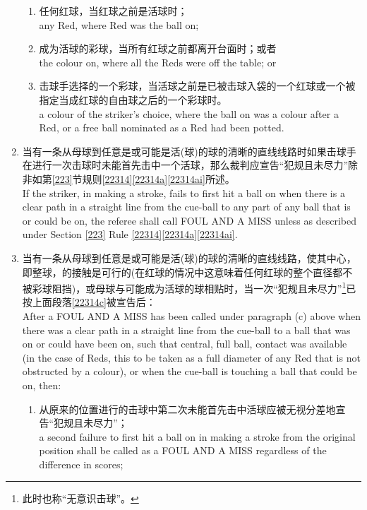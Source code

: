 \begin{enumerate}[label=(\alph*)]
    \begin{enumerate}[label=(\roman*)]
        \item 任何红球，当红球之前是活球时；\\
        any Red, where Red was the ball on;
        \item 成为活球的彩球，当所有红球之前都离开台面时；或者\\
        the colour on, where all the Reds were off the table; or
        \item 击球手选择的一个彩球，当活球之前是已被击球入袋的一个红球或一个被指定当成红球的自由球之后的一个彩球时。\\
        a colour of the striker's choice, where the ball on was a colour after a Red, or a free ball nominated as a Red had been potted.
    \end{enumerate}
    \item \label{22314c}当有一条从母球到任意是或可能是活(球)的球的清晰的直线线路时如果击球手在进行一次击球时未能首先击中一个活球，那么裁判应宣告``犯规且未尽力''除非如第\ref{223}节规则\ref{22314}\ref{22314a}\ref{22314ai}所述。\\
    If the striker, in making a stroke, fails to first hit a ball on when there is a clear path in a straight line from the cue-ball to any part of any ball that is or could be on, the referee shall call FOUL AND A MISS unless as described under Section \ref{223} Rule \ref{22314}\ref{22314a}\ref{22314ai}.
    \item \label{22314d}当有一条从母球到任意是或可能是活(球)的球的清晰的直线线路，使其中心，即整球，的接触是可行的(在红球的情况中这意味着任何红球的整个直径都不被彩球阻挡)，或母球与可能成为活球的球相贴时，当一次``犯规且未尽力''\footnote{此时也称``无意识击球''。}已按上面段落\ref{22314c}被宣告后：\\
    After a FOUL AND A MISS has been called under paragraph (c) above when there was a clear path in a straight line from the cue-ball to a ball that was on or could have been on, such that central, full ball, contact was available (in the case of Reds, this to be taken as a full diameter of any Red that is not obstructed by a colour), or when the cue-ball is touching a ball that could be on, then:
    \begin{enumerate}[label=(\roman*)]
        \item \label{22314di}从原来的位置进行的击球中第二次未能首先击中活球应被无视分差地宣告``犯规且未尽力''；\\
        a second failure to first hit a ball on in making a stroke from the original position shall be called as a FOUL AND A MISS regardless of the difference in scores;

\end{enumerate}
\end{enumerate}
